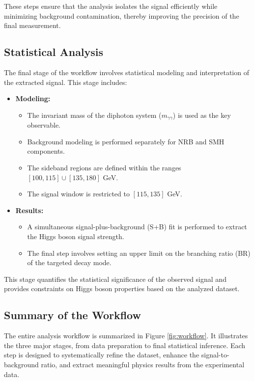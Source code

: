 These steps ensure that the analysis isolates the signal efficiently while minimizing background contamination, thereby improving the precision of the final measurement.

\subsection{Statistical Analysis}
The final stage of the workflow involves statistical modeling and interpretation of the extracted signal. This stage includes:

\begin{itemize}
\item \textbf{Modeling:}
\begin{itemize}
\item The invariant mass of the diphoton system ($m_{\gamma\gamma}$) is used as the key observable.
\item Background modeling is performed separately for NRB and SMH components.
\item The sideband regions are defined within the ranges $[100,115] \cup [135,180]$ GeV.
\item The signal window is restricted to $[115,135]$ GeV.
\end{itemize}
\item \textbf{Results:}
\begin{itemize}
\item A simultaneous signal-plus-background (S+B) fit is performed to extract the Higgs boson signal strength.
\item The final step involves setting an upper limit on the branching ratio (BR) of the targeted decay mode.
\end{itemize}
\end{itemize}

This stage quantifies the statistical significance of the observed signal and provides constraints on Higgs boson properties based on the analyzed dataset.

\subsection{Summary of the Workflow}
The entire analysis workflow is summarized in Figure \ref{fig:workflow}. It illustrates the three major stages, from data preparation to final statistical inference. Each step is designed to systematically refine the dataset, enhance the signal-to-background ratio, and extract meaningful physics results from the experimental data.

